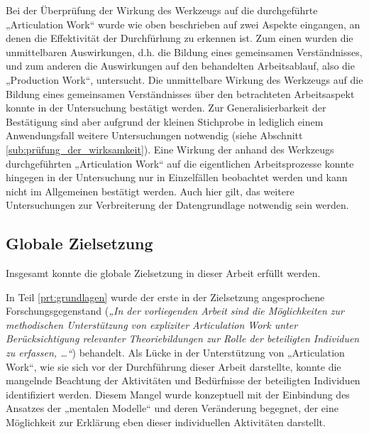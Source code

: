 Bei der Überprüfung der Wirkung des Werkzeugs auf die durchgeführte „Articulation Work“ wurde wie oben beschrieben auf zwei Aspekte eingangen, an denen die Effektivität der Durchfürhung zu erkennen ist. Zum einen wurden die unmittelbaren Auswirkungen, d.h. die Bildung eines gemeinsamen Verständnisses, und zum anderen die Auswirkungen auf den behandelten Arbeitsablauf, also die „Production Work“, untersucht. Die unmittelbare Wirkung des Werkzeugs auf die Bildung eines gemeinsamen Verständnisses über den betrachteten Arbeitsaspekt konnte in der Untersuchung bestätigt werden. Zur Generalisierbarkeit der Bestätigung sind aber aufgrund der kleinen Stichprobe in lediglich einem Anwendungsfall weitere Untersuchungen notwendig (siehe Abschnitt \ref{sub:prüfung_der_wirksamkeit}). Eine Wirkung der anhand des Werkzeugs durchgeführten „Articulation Work“ auf die eigentlichen Arbeitsprozesse konnte hingegen in der Untersuchung nur in Einzelfällen beobachtet werden und kann nicht im Allgemeinen bestätigt werden. Auch hier gilt, das weitere Untersuchungen zur Verbreiterung der Datengrundlage notwendig sein werden.

\subsection{Globale Zielsetzung} %
\label{sub:globale_zielsetzung}

Insgesamt konnte die globale Zielsetzung in dieser Arbeit erfüllt werden. 

In Teil \ref{prt:grundlagen} wurde der erste in der Zielsetzung angesprochene Forschungsgegenstand (\emph{„In der vorliegenden Arbeit sind die Möglichkeiten zur methodischen Unterstützung von expliziter Articulation Work unter Berücksichtigung relevanter Theoriebildungen zur Rolle der beteiligten Individuen zu erfassen, \ldots“}) behandelt. Als Lücke in der Unterstützung von „Articulation Work“, wie sie sich vor der Durchführung dieser Arbeit darstellte, konnte die mangelnde Beachtung der Aktivitäten und Bedürfnisse der beteiligten Individuen identifiziert werden. Diesem Mangel wurde konzeptuell mit der Einbindung des Ansatzes der „mentalen Modelle“ und deren Veränderung begegnet, der eine Möglichkeit zur Erklärung eben dieser individuellen Aktivitäten darstellt.

